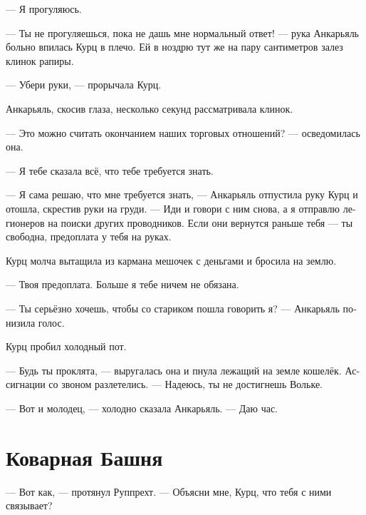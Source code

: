 \documentclass[a4paper,12pt,fleqn]{book}\usepackage{polyglossia}\setdefaultlanguage[babelshorthands=true]{russian}\setotherlanguage{english}\defaultfontfeatures{Ligatures=TeX,Mapping=tex-text}\usepackage{xcolor}\newcommand{\ml}[3]{#2}
\begin{document}
\ml{$0$}
{--- Я прогуляюсь.}
{``I have a walk.''}

--- Ты не прогуляешься, пока не дашь мне нормальный ответ! --- рука Анкарьяль больно впилась Курц в плечо.
Ей в ноздрю тут же на пару сантиметров залез клинок рапиры.

\ml{$0$}
{--- Убери руки, --- прорычала Курц.}
{``Get your hands off,'' Kurz growled.}

Анкарьяль, скосив глаза, несколько секунд рассматривала клинок.

\ml{$0$}
{--- Это можно считать окончанием наших торговых отношений? --- осведомилась она.}
{``Can this be considered the end of our trade relations?'' she asked.}

\ml{$0$}
{--- Я тебе сказала всё, что тебе требуется знать.}
{``I've told you everything you need to know.''}

--- Я сама решаю, что мне требуется знать, --- Анкарьяль отпустила руку Курц и отошла, скрестив руки на груди.
--- Иди и говори с ним снова, а я отправлю легионеров на поиски других проводников.
\ml{$0$}
{Если они вернутся раньше тебя --- ты свободна, предоплата у тебя на руках.}
{If one of them returns sooner than you, you're dismissed with your pre-payment.''}

Курц молча вытащила из кармана мешочек с деньгами и бросила на землю.

\ml{$0$}
{--- Твоя предоплата.}
{``Your pre-payment.}
\ml{$0$}
{Больше я тебе ничем не обязана.}
{I owe you nothing more.''}

\ml{$0$}
{--- Ты серьёзно хочешь, чтобы со стариком пошла говорить я? --- Анкарьяль понизила голос.}
{``You really want me to negotiate with the old man?'' Angaralle said in a low voice.}

Курц пробил холодный пот.

--- Будь ты проклята, --- выругалась она и пнула лежащий на земле кошелёк.
Ассигнации со звоном разлетелись.
\ml{$0$}
{--- Надеюсь, ты не достигнешь Вольке.}
{``May you never reach Wolke.''}

\ml{$0$}
{--- Вот и молодец, --- холодно сказала Анкарьяль.}
{``Good girl,'' Angaralle coldly said.}
\ml{$0$}
{--- Даю час.}
{``You have one hour.''}

\section{Коварная Башня}

--- Вот как, --- протянул Руппрехт.
--- Объясни мне, Курц, что тебя с ними связывает?
\end{document}
